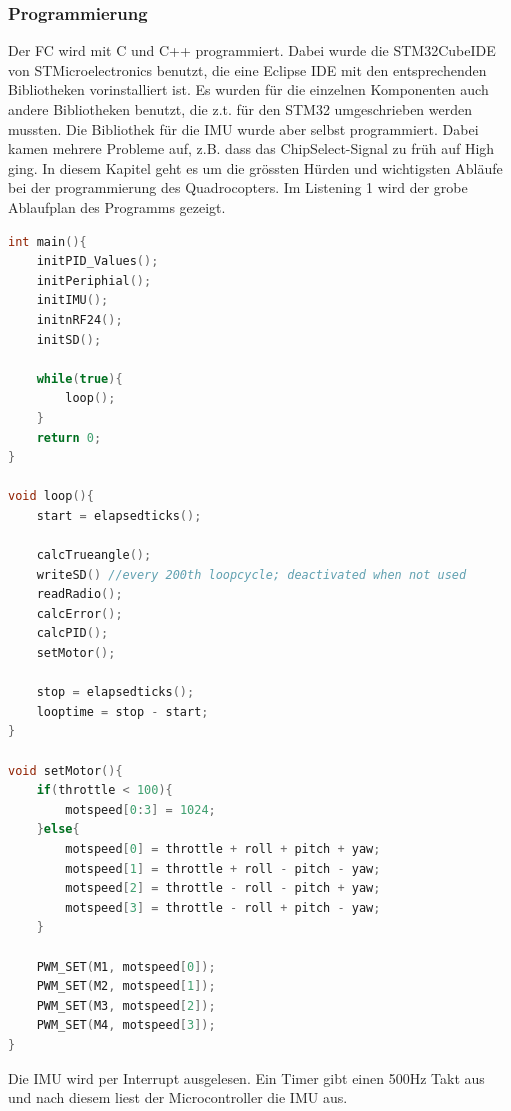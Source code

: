 \documentclass[12pt,a4paper, ngerman]{article}
\begin{document}
\subsubsection{Programmierung}
Der FC wird mit C und C++ programmiert. Dabei wurde die STM32CubeIDE von STMicroelectronics benutzt, die eine Eclipse IDE mit den entsprechenden Bibliotheken vorinstalliert ist. Es wurden für die einzelnen Komponenten auch andere Bibliotheken benutzt, die z.t. für den STM32 umgeschrieben werden mussten. Die Bibliothek für die IMU wurde aber selbst programmiert. Dabei kamen mehrere Probleme auf, z.B. dass das ChipSelect-Signal zu früh auf High ging. In diesem Kapitel geht es um die grössten Hürden und wichtigsten Abläufe bei der programmierung des Quadrocopters. Im Listening 1 wird der grobe Ablaufplan des Programms gezeigt.

\begin{lstlisting}[language=C++,caption=Programmablauf Pseudocode]
int main(){
	initPID_Values();
	initPeriphial();
	initIMU();
	initnRF24();
	initSD();
	
	while(true){
		loop();
	}
	return 0;
}

void loop(){
	start = elapsedticks();
	
	calcTrueangle();
	writeSD() //every 200th loopcycle; deactivated when not used
	readRadio();
	calcError();
	calcPID();
	setMotor();
	
	stop = elapsedticks();
	looptime = stop - start;
}

void setMotor(){
	if(throttle < 100){
		motspeed[0:3] = 1024;	
	}else{
		motspeed[0] = throttle + roll + pitch + yaw; 
		motspeed[1]	= throttle + roll - pitch - yaw;
		motspeed[2]	= throttle - roll - pitch + yaw;
		motspeed[3]	= throttle - roll + pitch - yaw;
	}
	
	PWM_SET(M1, motspeed[0]);
	PWM_SET(M2, motspeed[1]);
	PWM_SET(M3, motspeed[2]);
	PWM_SET(M4, motspeed[3]);
}
\end{lstlisting}
\noindent
Die IMU wird per Interrupt ausgelesen. Ein Timer gibt einen 500Hz Takt aus und nach diesem liest der Microcontroller die IMU aus.
\newpage
\end{document}
